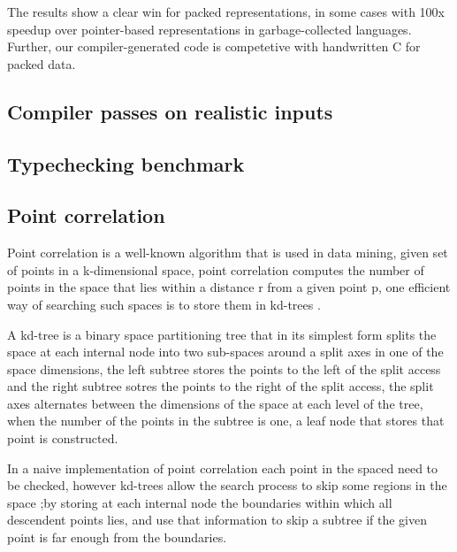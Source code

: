 \documentclass[preprint,10pt,nocopyrightspace,nonatbib]{./bibs/sigplanconf}
\begin{document}
The results show a clear win for packed representations, in some cases
with 100x speedup over pointer-based representations in
garbage-collected languages. Further, our compiler-generated code is
competetive with handwritten C for packed data.



\subsection{Compiler passes on realistic inputs}



\subsection{Typechecking benchmark}


\subsection{Point correlation}
Point correlation  is a well-known algorithm that is used in data mining\cite{capnproto},
given set of points in a k-dimensional space, point correlation computes the number of points in the space  that lies within a
distance r from a given point p, one efficient way of searching such spaces is to store them in  kd-trees \cite{capnproto}. 

A kd-tree is a binary space partitioning tree that in its simplest form  splits the space at each internal node into two sub-spaces
around a split axes in one of the space dimensions, the left subtree stores the points to the left of the split access
and the right subtree sotres the points to the right of the split access, the split axes alternates between the dimensions of
the space at each level of the tree, when the number of the points in the subtree is one, a leaf node that stores
that point is constructed.

In a naive implementation of point correlation each point in the spaced need to be checked, however kd-trees 
allow the search process to skip some regions in the space ;by storing at each internal node the boundaries within which all descendent points lies,
and use that information to skip a subtree if the given point is far enough from the boundaries.
\end{document}
